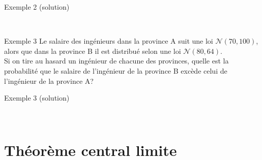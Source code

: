 \documentclass{BeamerTemplate}
\begin{document}
\begin{frame}[t]{Exemple 2 (solution)}

{\ }
\end{frame}

\begin{frame}[t]{Exemple 3}
Le salaire des ingénieurs dans la province A suit une loi $\mathcal{N}(70,100)$, alors que dans la province B il est distribué selon une loi $\mathcal{N}(80,64)$. \\

Si on tire au hasard un ingénieur de chacune des provinces, quelle est la probabilité que le salaire de l'ingénieur de la province B excède celui de l'ingénieur de la province A?


\end{frame}

\begin{frame}[t]{Exemple 3 (solution)}

{\ }
\end{frame}

\section{Théorème central limite }

\subsection*{ }

\end{document}
